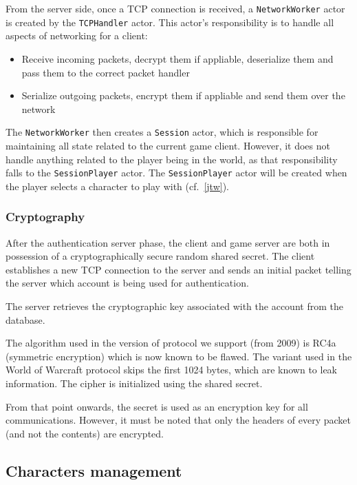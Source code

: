\documentclass[paper=a4, fontsize=11pt]{scrartcl}
\begin{document}
From the server side, once a TCP connection is received, a
\texttt{NetworkWorker} actor is created by the \texttt{TCPHandler} actor.
This actor's responsibility is to handle all aspects of networking for a client:
\begin{itemize}
    \item Receive incoming packets, decrypt them if appliable, deserialize them
        and pass them to the correct packet handler
    \item Serialize outgoing packets, encrypt them if appliable and send them
        over the network
\end{itemize}

The \texttt{NetworkWorker} then creates a \texttt{Session} actor, which is
responsible for maintaining all state related to the current game client.
However, it does not handle anything related to the player being in the world,
as that responsibility falls to the \texttt{SessionPlayer} actor.
The \texttt{SessionPlayer} actor will be created when the player selects a
character to play with (cf.~\ref{jtw}).

\subsubsection{Cryptography}

After the authentication server phase, the client and game server are both in
possession of a cryptographically secure random shared secret.
The client establishes a new TCP connection to the server and sends an initial
packet telling the server which account is being used for authentication.

The server retrieves the cryptographic key associated with the account from the
database.

The algorithm used in the version of protocol we support (from
2009) is RC4a (symmetric encryption) which is now known to be flawed.
The variant used in the World of Warcraft protocol skips the first 1024 bytes,
which are known to leak information.
The cipher is initialized using the shared secret.

From that point onwards, the secret is used as an encryption key for all
communications.
However, it must be noted that only the headers of every packet
(and not the contents) are encrypted.

\subsection{Characters management}
\end{document}
